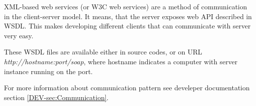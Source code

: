 XML-based web services (or W3C web services) are a method of communication in
the client-server model. It means, that the server exposes web API described in
WSDL. This makes developing different clients that can communicate with
\textan{} server very easy.

These WSDL files are available either in source codes, or on URL \emph{http://hostname:port/soap},
where hostname indicates a computer with \textan{} server instance running on the port.

For more information about communication pattern see develeper documentation
section \ref{DEV-sec:Communication}.
